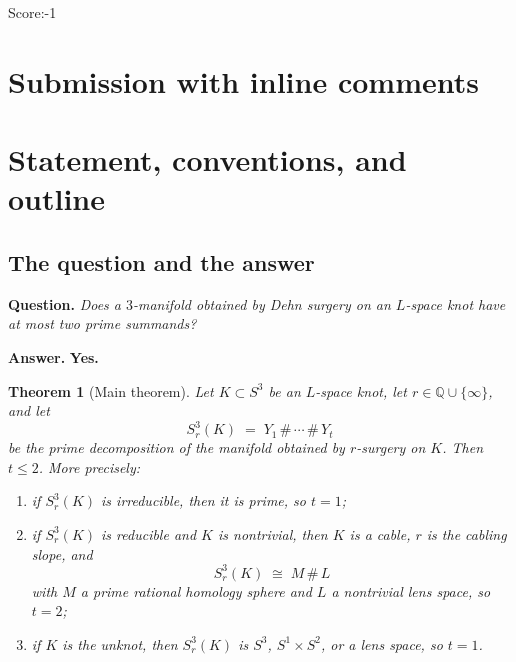 \documentclass[11pt]{article}
\newtheorem{theorem}{Theorem}[section]
\theoremstyle{definition}
\theoremstyle{remark}
\begin{document}
\noindent Score:-1
\newpage
\section{Submission with inline comments}


\begin{abstract}
\noindent We answer the question affirmatively: every closed $3$-manifold
obtained by Dehn surgery on an $L$-space knot $K\subset S^{3}$ has at most two
prime summands.  More precisely we show that such a manifold is either prime,
or the connected sum of exactly two prime rational homology spheres; the
second alternative occurs exactly for the cabling surgery on a cabled
$L$-space knot (e.g.\ $6$-surgery on the right-handed trefoil
$L(2,3)\,\#\,L(3,2)$).  The non-elementary inputs are stated precisely where
they are used; the reductions, the splitting computation for cabling
surgeries, and the case analysis are proved in full.
\end{abstract}

\section{Statement, conventions, and outline}

\subsection{The question and the answer}

\textbf{Question.} \emph{Does a $3$-manifold obtained by Dehn surgery on an
$L$-space knot have at most two prime summands?}

\medskip
\noindent\textbf{Answer.} \textbf{Yes.}

\begin{theorem}[Main theorem]\label{thm:main}
Let $K\subset S^{3}$ be an $L$-space knot, let $r\in\mathbb{Q}\cup\{\infty\}$,
and let
\[
S^{3}_{r}(K)\;=\;Y_{1}\,\#\,\cdots\,\#\,Y_{t}
\]
be the prime decomposition of the manifold obtained by $r$-surgery on $K$.
Then $t\le 2$.  More precisely:
\begin{enumerate}[label=\textup{(\roman*)},leftmargin=2.2em]
 \item if $S^{3}_{r}(K)$ is irreducible, then it is prime, so $t=1$;
 \item if $S^{3}_{r}(K)$ is reducible and $K$ is nontrivial, then $K$ is a
 cable, $r$ is the cabling slope, and
 \[
 S^{3}_{r}(K)\;\cong\;M\,\#\,L
 \]
 with $M$ a prime rational homology sphere and $L$ a nontrivial lens space, so
 $t=2$;
 \item if $K$ is the unknot, then $S^{3}_{r}(K)$ is $S^3$, $S^1\times S^2$, or
 a lens space, so $t=1$.
\end{enumerate}
\end{theorem}
\end{document}
